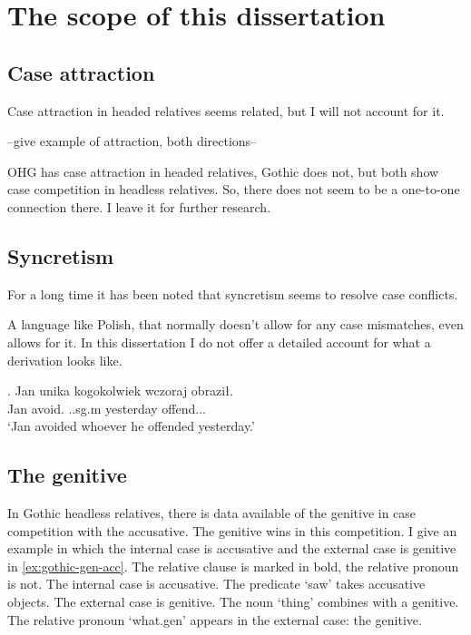 \section{The scope of this dissertation}

\subsection{Case attraction}

Case attraction in headed relatives seems related, but I will not account for it.

--give example of attraction, both directions--

OHG has case attraction in headed relatives, Gothic does not, but both show case competition in headless relatives. So, there does not seem to be a one-to-one connection there. I leave it for further research.

\subsection{Syncretism}

For a long time it has been noted that syncretism seems to resolve case conflicts.

A language like Polish, that normally doesn't allow for any case mismatches, even allows for it. In this dissertation I do not offer a detailed account for what a derivation looks like.

\exg. Jan unika kogokolwiek wczoraj obraził.\\
Jan avoid.\scsub{[gen]} ..\ac{sg}.\ac{m} yesterday offend..\scsub{[acc]}.\\
`Jan avoided whoever he offended yesterday.'

\subsection{The genitive}\label{sec:genitive}

In Gothic headless relatives, there is data available of the genitive in case competition with the accusative. The genitive wins in this competition.
I give an example in which the internal case is accusative and the external case is genitive in \ref{ex:gothic-gen-acc}.
The relative clause is marked in bold, the relative pronoun is not.
The internal case is accusative. The predicate  `saw' takes accusative objects.
The external case is genitive. The noun  `thing' combines with a genitive.
The relative pronoun  `what.\ac{gen}' appears in the external case: the genitive.

